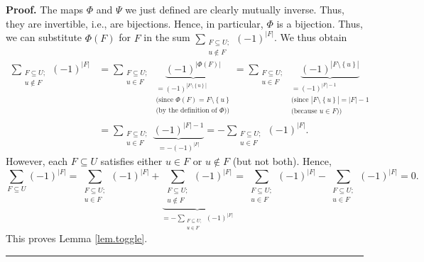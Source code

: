 \documentclass[numbers=enddot,12pt,final,onecolumn]{scrartcl}%
\theoremstyle{definition}
\newenvironment{proof}[1][Proof]{\noindent\textbf{#1.} }{\ \rule{0.5em}{0.5em}}
\let\sumnonlimits\sum
\renewcommand{\sum}{\sumnonlimits\limits}
\begin{document}
\begin{proof}
The maps $\Phi$ and $\Psi$ we just defined are clearly mutually inverse. Thus,
they are invertible, i.e., are bijections. Hence, in particular, $\Phi$ is a
bijection. Thus, we can substitute $\Phi\left(  F\right)  $ for $F$ in the sum
$\sum_{\substack{F\subseteq U;\\u\notin F}}\left(  -1\right)  ^{\left\vert
F\right\vert }$. We thus obtain%
\begin{align*}
\sum_{\substack{F\subseteq U;\\u\notin F}}\left(  -1\right)  ^{\left\vert
F\right\vert }  &  =\sum_{\substack{F\subseteq U;\\u\in F}}\underbrace{\left(
-1\right)  ^{\left\vert \Phi\left(  F\right)  \right\vert }}%
_{\substack{=\left(  -1\right)  ^{\left\vert F\setminus\left\{  u\right\}
\right\vert }\\\text{(since }\Phi\left(  F\right)  =F\setminus\left\{
u\right\}  \\\text{(by the definition of }\Phi\text{))}}}=\sum
_{\substack{F\subseteq U;\\u\in F}}\underbrace{\left(  -1\right)  ^{\left\vert
F\setminus\left\{  u\right\}  \right\vert }}_{\substack{=\left(  -1\right)
^{\left\vert F\right\vert -1}\\\text{(since }\left\vert F\setminus\left\{
u\right\}  \right\vert =\left\vert F\right\vert -1\\\text{(because }u\in
F\text{))}}}\\
&  =\sum_{\substack{F\subseteq U;\\u\in F}}\underbrace{\left(  -1\right)
^{\left\vert F\right\vert -1}}_{=-\left(  -1\right)  ^{\left\vert F\right\vert
}}=-\sum_{\substack{F\subseteq U;\\u\in F}}\left(  -1\right)  ^{\left\vert
F\right\vert }.
\end{align*}
However, each $F\subseteq U$ satisfies either $u\in F$ or $u\notin F$ (but not
both). Hence,%
\[
\sum_{F\subseteq U}\left(  -1\right)  ^{\left\vert F\right\vert }%
=\sum_{\substack{F\subseteq U;\\u\in F}}\left(  -1\right)  ^{\left\vert
F\right\vert }+\underbrace{\sum_{\substack{F\subseteq U;\\u\notin F}}\left(
-1\right)  ^{\left\vert F\right\vert }}_{=-\sum_{\substack{F\subseteq U;\\u\in
F}}\left(  -1\right)  ^{\left\vert F\right\vert }}=\sum_{\substack{F\subseteq
U;\\u\in F}}\left(  -1\right)  ^{\left\vert F\right\vert }-\sum
_{\substack{F\subseteq U;\\u\in F}}\left(  -1\right)  ^{\left\vert
F\right\vert }=0.
\]
This proves Lemma \ref{lem.toggle}.
\end{proof}
\end{document}

